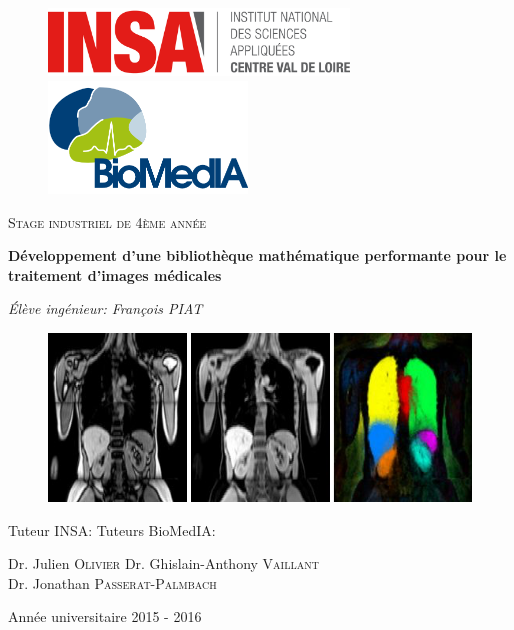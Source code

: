 \documentclass[10pt]{report}
\begin{document}
\begin{titlepage}	
	\flushleft
	\begin{figure}[!h]
		\includegraphics[height=1.8cm]{Reports/figures/logo_insa_cvl.png}
		\hfill
		\includegraphics[height=3cm]{Reports/figures/logo_biomedia.png}
	\end{figure}
	\centering
	\vspace{2cm}
	{\scshape\Large Stage industriel de 4ème année\par}
	\vspace{1.5cm}
	{\huge\bfseries Développement d'une bibliothèque mathématique performante pour le traitement d'images médicales\par}
	\vspace{2cm}
	{\Large\itshape Élève ingénieur: François PIAT\par}
		\vspace{1cm}
	\begin{figure}[!h]
		\begin{center}
			\includegraphics[width=13cm]{Reports/figures/biomedia_image.png}
		\end{center}
	\end{figure}
	\vfill
	\flushleft
	Tuteur INSA: \hfill Tuteurs BioMedIA: \par
	Dr. Julien \textsc{Olivier} \hfill Dr. Ghislain-Anthony \textsc{Vaillant} \\ \hfill Dr. Jonathan \textsc{Passerat-Palmbach}
	\vfill
	\centering
	{\large Année universitaire 2015 - 2016 \par}
\end{titlepage}
\end{document}
